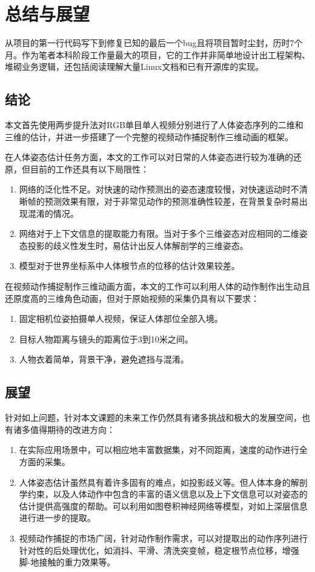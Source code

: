 
\chapter{总结与展望}

从项目的第一行代码写下到修复已知的最后一个bug且将项目暂时尘封，历时7个月。作为笔者本科阶段工作量最大的项目，它的工作并非简单地设计出工程架构、堆砌业务逻辑，还包括阅读理解大量Linux文档和已有开源库的实现。

\section{结论}{}

本文首先使用两步提升法对RGB单目单人视频分别进行了人体姿态序列的二维和三维的估计，并进一步搭建了一个完整的视频动作捕捉制作三维动画的框架。


在人体姿态估计任务方面，本文的工作可以对日常的人体姿态进行较为准确的还原，但目前的工作还具有以下局限性：
\begin{enumerate}
    \item 网络的泛化性不足。对快速的动作预测出的姿态速度较慢，对快速运动时不清晰帧的预测效果有限，对于非常见动作的预测准确性较差，在背景复杂时易出现混淆的情况。
    \item 网络对于上下文信息的提取能力有限。当对于多个三维姿态对应相同的二维姿态投影的歧义性发生时，易估计出反人体解剖学的三维姿态。
    \item 模型对于世界坐标系中人体根节点的位移的估计效果较差。
\end{enumerate}

在视频动作捕捉制作三维动画方面，本文的工作可以利用人体的动作制作出生动且还原度高的三维角色动画，但对于原始视频的采集仍具有以下要求：
\begin{enumerate}
    \item 固定相机位姿拍摄单人视频，保证人体部位全部入境。
    \item 目标人物距离与镜头的距离位于3到10米之间。
    \item 人物衣着简单，背景干净，避免遮挡与混淆。
\end{enumerate}

\section{展望}{}
针对如上问题，针对本文课题的未来工作仍然具有诸多挑战和极大的发展空间，也有诸多值得期待的改进方向：
\begin{enumerate}
    \item 在实际应用场景中，可以相应地丰富数据集，对不同距离，速度的动作进行全方面的采集。
    \item 人体姿态估计虽然具有着许多固有的难点，如投影歧义等。但人体本身的解剖学约束，以及人体动作中包含的丰富的语义信息以及上下文信息可以对姿态的估计提供高强度的帮助。可以利用如图卷积神经网络等模型，对如上深层信息进行进一步的提取。
    \item 视频动作捕捉的市场广阔，针对动作制作需求，可以对提取出的动作序列进行针对性的后处理优化，如消抖、平滑、清洗突变帧，稳定根节点位移，增强脚-地接触的重力效果等。
\end{enumerate}


